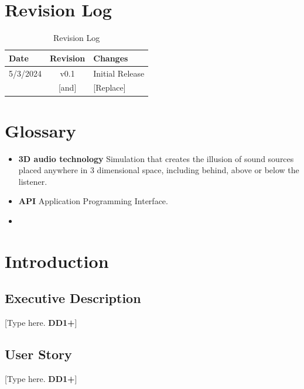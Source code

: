 \documentclass[letterpaper, 11pt]{article}
\begin{document}
\clearpage
\section*{Revision Log}
\begin{table}[h]
    \begin{tabularx}{\textwidth}{|l|c|X|} %
        \hline
        Date     & Revision & Changes         \\ \hline
        5/3/2024 & v0.1     & Initial Release \\ \hline
        [Copy]   & [and]    & [Replace]       \\ \hline
    \end{tabularx}
    \caption{Revision Log}
\end{table}

\clearpage
\section*{Glossary} %
\begin{itemize} %
    \item \textbf{3D audio technology} Simulation that creates the illusion of sound sources placed anywhere in 3 dimensional space, including behind, above or below the listener.
    \item \textbf{API} Application Programming Interface.
    \item
\end{itemize}

\clearpage
\section{Introduction}
\subsection{Executive Description}
[Type here. \textbf{DD1+}]
\subsection{User Story}
[Type here. \textbf{DD1+}]
\end{document}
